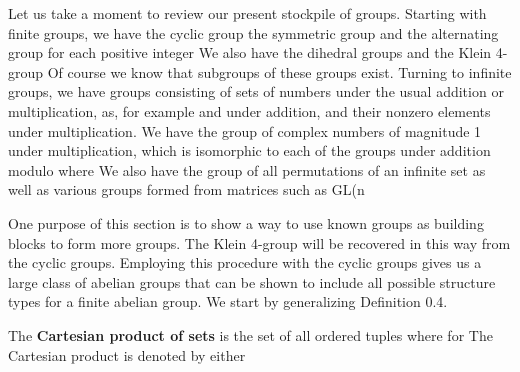\documentclass[11pt,oneside]{article}
\begin{document}
\fi
\renewcommand{\BookFooter}{Section 9 Finitely Generated Abelian Groups}
\ifdefined\BookMaster\else\setcounter{page}{88}\fi
\BookNarrativetrue

\begin{BookBody}



\noindent Let us take a moment to review our present stockpile of groups. Starting with finite groups, we have the cyclic group  the symmetric group  and the alternating group  for each positive integer  We also have the dihedral groups  and the Klein 4-group  Of course we know that subgroups of these groups exist. Turning to infinite groups, we have groups consisting of sets of numbers under the usual addition or multiplication, as, for example and  under addition, and their nonzero elements under multiplication. We have the group  of complex numbers of magnitude 1 under multiplication, which is isomorphic to each of the groups  under addition modulo  where  We also have the group  of all permutations of an infinite set  as well as various groups formed from matrices such as GL(n

One purpose of this section is to show a way to use known groups as building blocks to form more groups. The Klein 4-group will be recovered in this way from the cyclic groups. Employing this procedure with the cyclic groups gives us a large class of abelian groups that can be shown to include all possible structure types for a finite abelian group. We start by generalizing Definition 0.4.

 The\textbf{ Cartesian product of sets}  is the set of all ordered tuples  where  for  The Cartesian product is denoted by either


\end{BookBody}
\end{document}
